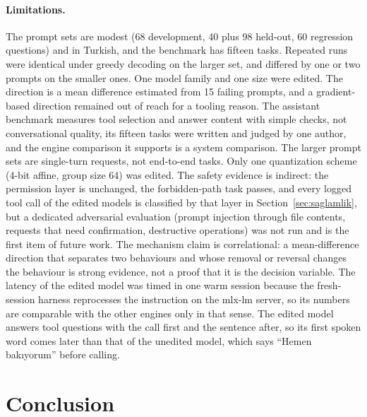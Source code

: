 \documentclass[11pt]{article}
\begin{document}
\paragraph{Limitations.} The prompt sets are modest (68 development, 40 plus 98 held-out, 60 regression questions) and in Turkish, and the benchmark has fifteen tasks. Repeated runs were identical under greedy decoding on the larger set, and differed by one or two prompts on the smaller ones. One model family and one size were edited. The direction is a mean difference estimated from 15 failing prompts, and a gradient-based direction remained out of reach for a tooling reason. The assistant benchmark measures tool selection and answer content with simple checks, not conversational quality, its fifteen tasks were written and judged by one author, and the engine comparison it supports is a system comparison. The larger prompt sets are single-turn requests, not end-to-end tasks. Only one quantization scheme (4-bit affine, group size 64) was edited. The safety evidence is indirect: the permission layer is unchanged, the forbidden-path task passes, and every logged tool call of the edited models is classified by that layer in Section~\ref{sec:saglamlik}, but a dedicated adversarial evaluation (prompt injection through file contents, requests that need confirmation, destructive operations) was not run and is the first item of future work. The mechanism claim is correlational: a mean-difference direction that separates two behaviours and whose removal or reversal changes the behaviour is strong evidence, not a proof that it is the decision variable. The latency of the edited model was timed in one warm session because the fresh-session harness reprocesses the instruction on the mlx-lm server, so its numbers are comparable with the other engines only in that sense. The edited model answers tool questions with the call first and the sentence after, so its first spoken word comes later than that of the unedited model, which says ``Hemen bakıyorum'' before calling.

\section{Conclusion}
\end{document}
